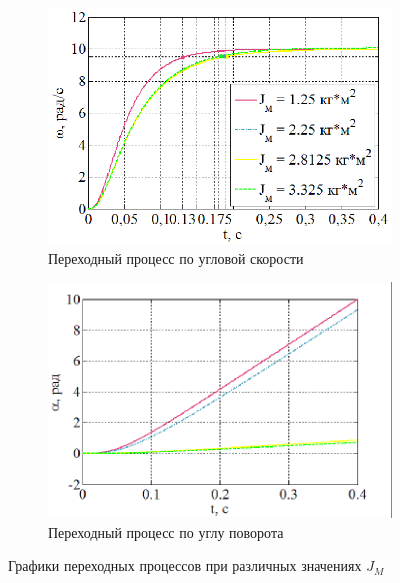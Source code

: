 \documentclass[a4paper,12pt]{article} %
\begin{document}
\begin{figure}[H]
	\begin{subfigure}[b]{0.48\textwidth}
		\includegraphics[width = \textwidth]{scheme/W2}
		\caption{Переходный процесс по угловой скорости}
	\end{subfigure}
	\hfill
	\begin{subfigure}[b]{0.48\textwidth}
		\includegraphics[width = \textwidth]{scheme/A2}
		\caption{Переходный процесс по углу поворота}
	\end{subfigure}
	\caption{Графики переходных процессов при различных значениях $J_M$}
	\label{UIwa2}
\end{figure}

\newpage
\end{document}

